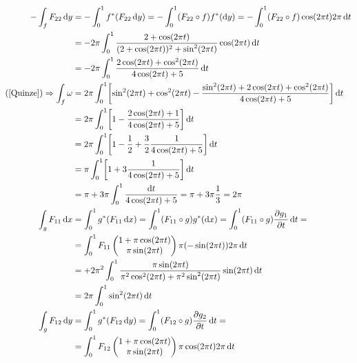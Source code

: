 \documentclass[12pt,a4paper]{article}
\begin{document}
		\begin{align}
			- \int_f F_{22} \,\mathrm{d}y &= - \int_0^1 f^*(F_{22} \,\mathrm{d}y) = - \int_0^1 (F_{22} \circ f) f^*(\mathrm{d}y) = - \int_0^1 (F_{22} \circ f) \cos (2\pi t) 2\pi \,\mathrm{d}t \\
			& = - 2\pi \int_0^1 \frac{2 + \cos(2\pi t)}{(2 + \cos(2\pi t))^2 + \sin^2(2\pi t)} \cos (2\pi t) \,\mathrm{d}t \\
			& = - 2\pi \int_0^1 \frac{2\cos(2\pi t) + \cos^2(2\pi t)}{4 \cos(2\pi t) + 5} \,\mathrm{d}t \\
			(\ref{Quinze}) \Rightarrow \int_f \omega &= 2\pi \int_0^1 \biggl[ \sin^2 (2\pi t) + \cos^2 (2\pi t) - \frac{\sin^2(2\pi t) + 2\cos(2\pi t) + \cos^2(2\pi t)}{4 \cos(2\pi t) + 5} \biggl] \,\mathrm{d}t \\
			&= 2\pi \int_0^1 \biggl[ 1 - \frac{2\cos(2\pi t) + 1}{4 \cos(2\pi t) + 5} \biggl] \,\mathrm{d}t \\
			&= 2\pi \int_0^1 \biggl[ 1 - \frac{1}{2} + \frac{3}{2}\frac{1}{4 \cos(2\pi t) + 5} \biggl] \,\mathrm{d}t \\
			&= \pi \int_0^1 \biggl[ 1 + 3\frac{1}{4 \cos(2\pi t) + 5} \biggl] \,\mathrm{d}t \\
			&= \pi + 3\pi \int_0^1 \frac{\mathrm{d}t}{4 \cos(2\pi t) + 5} = \pi + 3\pi \frac{1}{3} = 2 \pi \\
			\int_g F_{11} \,\mathrm{d}x &= \int_0^1 g^*(F_{11} \,\mathrm{d}x) = \int_0^1 (F_{11} \circ g) g^*(\mathrm{d}x) = \int_0^1 (F_{11} \circ g) \frac{\partial g_1}{\partial t}\,\mathrm{d}t = \\
			&= \int_0^1 F_{11} \begin{pmatrix} 1 + \pi \cos(2\pi t) \\ \pi \sin(2\pi t) \end{pmatrix} \pi (-\sin (2\pi t)) 2\pi \,\mathrm{d}t \\
			&= + 2\pi^2 \int_0^1 \frac{\pi \sin(2\pi t) }{\pi^2 \cos^2(2\pi t) + \pi^2 \sin^2(2\pi t) } \sin (2\pi t) \,\mathrm{d}t \\
			&= 2\pi \int_0^1 \sin^2(2\pi t) \,\mathrm{d}t \\
			\int_g F_{12} \,\mathrm{d}y &= \int_0^1 g^*(F_{12} \,\mathrm{d}y) = \int_0^1 (F_{12} \circ g) \frac{\partial g_2}{\partial t}\,\mathrm{d}t = \\
			&= \int_0^1 F_{12} \begin{pmatrix} 1 + \pi \cos(2\pi t) \\ \pi \sin(2\pi t) \end{pmatrix} \pi \cos(2\pi t) 2\pi \,\mathrm{d}t \\

\end{align}
\end{document}
